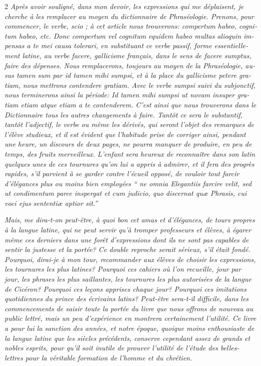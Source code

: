 \begin{otherlanguage}{french}
\begin{multicols}{2}
\textit{Après avoir souligné, dans mon devoir, les expressions qui me déplaisent, je cherche à les remplacer au moyen du dictionnaire de Phraséologie. Prenons, pour commencer, le verbe, scio ; à cet article nous trouverons: compertum habeo, cognitum habeo, etc. Donc compertum vel cognitum equidem habeo multas alioquin impensas a te mei causa tolerari, en substituant ce verbe passif, forme essentiellement latine, au verbe facere, gallicisme français, dans le sens de facere sumptus, faire des dépenses. Nous remplacerons, toujours au moyen de la Phraséologie, ausus tamen sum par id tamen mihi sumpsi, et à la place du gallicisme petere gratiam, nous mettrons contendere gratiam. Avec le verbe sumpsi suivi du subjonctif, nous terminerons ainsi la période: Id tamen mihi sumpsi ut novam insuper gratiam etiam atque etiam a te contenderem. C’est ainsi que nous trouverons dans le Dictionnaire tous les autres changements à faire. Tantôt ce sera le substantif, tantôt l’adjectif, le verbe ou même les dérivés, qui seront l’objet des remarques de l’élève studieux, et il est évident que l’habitude prise de corriger ainsi, pendant une heure, un discours de deux pages, ne pourra manquer de produire, en peu de temps, des fruits merveilleux. L’enfant sera heureux de reconnaître dans son latin quelques unes de ces tournures qu’on lui a appris à admirer, et il fera des progrès rapides, s’il parvient à se garder contre l’écueil opposé, de vouloir tout farcir d’élégances plus ou moins bien employées “ ne omnia Elegantiis farcire velit, sed ut condimentum parce inspergat et cum judicio, quo discernat quæ Phrasis, cui voci ejus sententiæ aptior sit.”}

\textit{Mais, me dira-t-on peut-être, à quoi bon cet amas et d’élégances, de tours propres à la langue latine, qui ne peut servir qu’à tromper professeurs et élèves, à égarer même ces derniers dans une forêt d’expressions dont ils ne sont pas capables de sentir la justesse et la portée? Ce double reproche serait sérieux, s’il était fondé. Pourquoi, dirai-je à mon tour, recommander aux élèves de choisir les expressions, les tournures les plus latines? Pourquoi ces cahiers où l’on recueille, jour par jour, les phrases les plus saillantes, les tournures les plus autorisées de la langue de Cicéron? Pourquoi ces leçons apprises chaque jour? Pourquoi ces imitations quotidiennes du prince des écrivains latins? Peut-être sera-t-il difficile, dans les commencements de saisir toute la portée du livre que nous offrons de nouveau au public lettré, mais un peu d’expérience en montrera certainement l’utilité. Ce livre a pour lui la sanction des années, et notre époque, quoique moins enthousiaste de la langue latine que les siècles précédents, conserve cependant assez de grands et nobles esprits, pour qu’il soit inutile de prouver l’utilité de l’étude des belles-lettres pour la véritable formation de l’homme et du chrétien.}


\end{multicols}
\end{otherlanguage}
